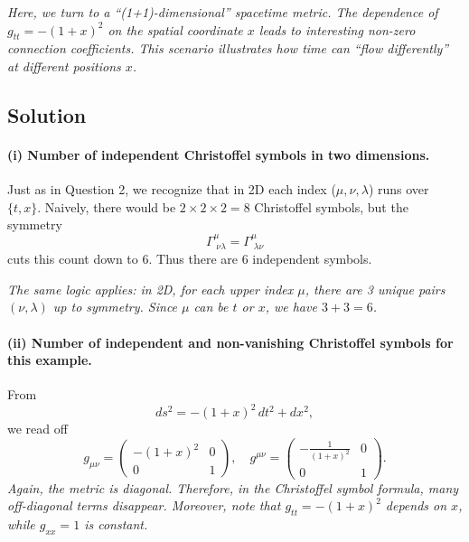 \emph{Here, we turn to a “(1+1)-dimensional” spacetime metric. The dependence of \(g_{tt} = -(1+x)^2\) on the spatial coordinate \(x\) leads to interesting non-zero connection coefficients. This scenario illustrates how time can “flow differently” at different positions \(x\).}

\subsection*{Solution}

\paragraph{(i) Number of independent Christoffel symbols in two dimensions.}

Just as in Question 2, we recognize that in 2D each index (\(\mu,\nu,\lambda\)) runs over \(\{t,x\}\). Naively, there would be \(2 \times 2 \times 2 = 8\) Christoffel symbols, but the symmetry
\[
\Gamma^\mu_{\;\nu\lambda} = \Gamma^\mu_{\;\lambda\nu}
\]
cuts this count down to \(6\). Thus there are \(\boxed{6}\) independent symbols.

\emph{The same logic applies: in 2D, for each upper index \(\mu\), there are 3 unique pairs \((\nu,\lambda)\) up to symmetry. Since \(\mu\) can be \(t\) or \(x\), we have \(3+3 = 6\).}

\paragraph{(ii) Number of independent and non-vanishing Christoffel symbols for this example.}

From
\[
ds^2 = -(1+x)^2 \, dt^2 + dx^2,
\]
we read off
\[
g_{\mu\nu} =
\begin{pmatrix}
-(1+x)^2 & 0 \\
0 & 1
\end{pmatrix},
\quad
g^{\mu\nu} =
\begin{pmatrix}
-\frac{1}{(1+x)^2} & 0 \\
0 & 1
\end{pmatrix}.
\]
\emph{Again, the metric is diagonal. Therefore, in the Christoffel symbol formula, many off-diagonal terms disappear. Moreover, note that \(g_{tt} = -(1+x)^2\) depends on \(x\), while \(g_{xx} = 1\) is constant.}

